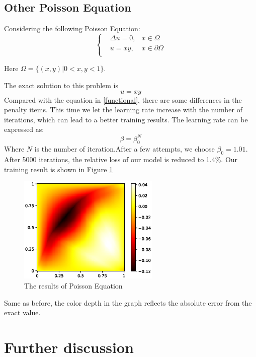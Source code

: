 \documentclass{article}
\begin{document}
\subsection{Other Poisson Equation}
\par Considering the following Poisson Equation:
\begin{equation}
\left\{
\begin{aligned}
& \Delta u=0, & x\in \Omega \\
 &u=xy,   &x\in \partial \Omega \\
 \end{aligned}
\right.
\end{equation}

Here $\Omega =\{(x,y)| 0<x,y<1\}$.
\par The exact solution to this problem is 
\begin{equation}
u=xy
\end{equation}
Compared with the equation in \ref{functional}, there are some differences in the penalty items. This time we let the learning rate increase with the number of iterations, which can lead to a better training results. The learning rate can be expressed as:
\begin{equation}
\beta=\beta_{0}^N
\end{equation}
Where $N$ is the number of iteration.After a few attempts, we choose $\beta_0=1.01$. After 5000 iterations, the relative loss of our model is reduced to 1.4\%. Our training result is shown in Figure \ref{3.2a}
\begin{figure}[ht]
 	 \centering
 	 \includegraphics[width=0.6\textwidth]{./images/loss_yubing.eps} 
	 \caption {The results of Poisson Equation}
	 \label{3.2a}
\end{figure}

Same as before, the color depth in the graph reflects the absolute error from the exact value.


\section{Further discussion}
\end{document}
